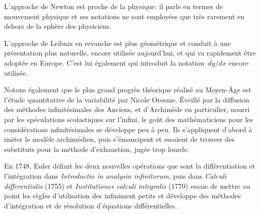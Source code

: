 \begin{histoire}
L'approche de Newton est proche de la physique: il parle en termes de mouvement physique et ses notations
ne sont employées que très rarement en dehors de la sphère des physiciens.

L'approche de Leibniz en revanche est plus géométrique et conduit à une présentation plus naturelle,
encore utilisée aujourd'hui, et qui va rapidement être adoptée en Europe. C'est lui également qui
introduit la notation~$dy/dx$ encore utilisée.

\medskip
{}

\medskip
Notons également que le plus grand progrès théorique réalisé au Moyen-Âge est l'étude
quantitative de la variabilité par Nicole Oresme.
Éveillé par la diffusion des méthodes infinitésimales des Anciens, et d'Archimède
en particulier, nourri par les spéculations scolastiques sur l'infini, le goût des
mathématiciens pour les considérations infinitésimales se développe peu à peu.
Ils s'appliquent d'abord à imiter le modèle archimédien, puis s'émancipent et essaient
de trouver des substituts pour la méthode d'exhaustion, jugée trop lourde.

\medskip
En 1748, Euler
 définit les deux nouvelles opérations que sont la différentiation et l'intégration
dans \emph{Introductio in analysin infinitorum}, puis dans \emph{Calculi differentialis} (1755) et
\emph{Institutiones calculi integralis} (1770) essaie de mettre au point les règles d'utilisation des
infiniment petits et développe des méthodes d'intégration et de résolution d'équations différentielles.
\end{histoire}

